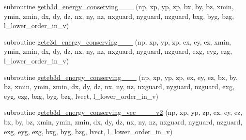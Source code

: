 \begin{DoxyCompactItemize}
\item 
subroutine \hyperlink{field__gathering_8_f90_a14f7dada83129910dde71b2237a3113b}{getb3d\+\_\+energy\+\_\+conserving\+\_\+\_\+\_} (np, xp, yp, zp, bx, by, bz, xmin, ymin, zmin,                                                                                                                                                                           dx, dy, dz, nx, ny, nz, nxguard, nyguard, nzguard,                                                                                                                                                   bxg, byg, bzg, l\+\_\+lower\+\_\+order\+\_\+in\+\_\+v)
\item 
subroutine \hyperlink{field__gathering_8_f90_a31c9a7c694702493d3f93ec9abaab046}{gete3d\+\_\+energy\+\_\+conserving\+\_\+\_\+\_} (np, xp, yp, zp, ex, ey, ez, xmin, ymin, zmin,                                                                                                                                                                           dx, dy, dz, nx, ny, nz, nxguard, nyguard, nzguard,                                                                                                                                                   exg, eyg, ezg, l\+\_\+lower\+\_\+order\+\_\+in\+\_\+v)
\item 
subroutine \hyperlink{field__gathering_8_f90_aa296f91b8369f8c698d2503f0fb6beb4}{geteb3d\+\_\+energy\+\_\+conserving\+\_\+\_\+\_} (np, xp, yp, zp, ex, ey, ez, bx, by, bz,                                                                                                                                                                       xmin, ymin, zmin,                                                                                                                                                                                               dx, dy, dz, nx, ny, nz, nxguard, nyguard, nzguard,                                                                                                                                                                       exg, eyg, ezg, bxg, byg, bzg, lvect, l\+\_\+lower\+\_\+order\+\_\+in\+\_\+v)
\item 
subroutine \hyperlink{field__gathering_8_f90_a6e3a3b1519fdd7090c55244b49a8d80f}{geteb3d\+\_\+energy\+\_\+conserving\+\_\+vec\+\_\+\_\+\_\+\_\+v2} (np, xp, yp, zp, ex, ey, ez, bx, by, bz,                                                                                                                                                                       xmin, ymin, zmin,                                                                                                                                                                                               dx, dy, dz, nx, ny, nz, nxguard, nyguard, nzguard,                                                                                                                                                                       exg, eyg, ezg, bxg, byg, bzg, lvect, l\+\_\+lower\+\_\+order\+\_\+in\+\_\+v)

\end{DoxyCompactItemize}
